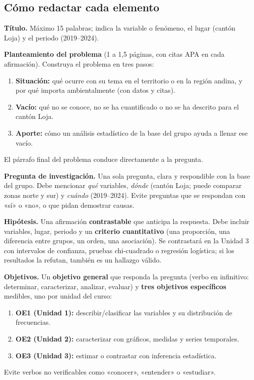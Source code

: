 \documentclass[11pt,a4paper]{article}
\begin{document}
\subsection{Cómo redactar cada elemento}

\textbf{Título.} Máximo 15 palabras; indica la variable o fenómeno, el lugar (cantón Loja) y el periodo (2019--2024).

\textbf{Planteamiento del problema} (1 a 1,5 páginas, con citas APA en cada afirmación). Construya el problema en tres pasos:
\begin{enumerate}
  \item \textbf{Situación:} qué ocurre con su tema en el territorio o en la región andina, y por qué importa ambientalmente (con datos y citas).
  \item \textbf{Vacío:} qué no se conoce, no se ha cuantificado o no se ha descrito para el cantón Loja.
  \item \textbf{Aporte:} cómo un análisis estadístico de la base del grupo ayuda a llenar ese vacío.
\end{enumerate}
El párrafo final del problema conduce directamente a la pregunta.

\textbf{Pregunta de investigación.} Una sola pregunta, clara y respondible con la base del grupo. Debe mencionar \emph{qué} variables, \emph{dónde} (cantón Loja; puede comparar zonas norte y sur) y \emph{cuándo} (2019--2024). Evite preguntas que se respondan con «sí» o «no», o que pidan demostrar causas.

\textbf{Hipótesis.} Una afirmación \textbf{contrastable} que anticipa la respuesta. Debe incluir variables, lugar, periodo y un \textbf{criterio cuantitativo} (una proporción, una diferencia entre grupos, un orden, una asociación). Se contrastará en la Unidad 3 con intervalos de confianza, pruebas chi-cuadrado o regresión logística; si los resultados la refutan, también es un hallazgo válido.

\textbf{Objetivos.} Un \textbf{objetivo general} que responda la pregunta (verbo en infinitivo: determinar, caracterizar, analizar, evaluar) y \textbf{tres objetivos específicos} medibles, uno por unidad del curso:
\begin{enumerate}
  \item \textbf{OE1 (Unidad 1):} describir/clasificar las variables y su distribución de frecuencias.
  \item \textbf{OE2 (Unidad 2):} caracterizar con gráficos, medidas y series temporales.
  \item \textbf{OE3 (Unidad 3):} estimar o contrastar con inferencia estadística.
\end{enumerate}
Evite verbos no verificables como «conocer», «entender» o «estudiar».
\end{document}
